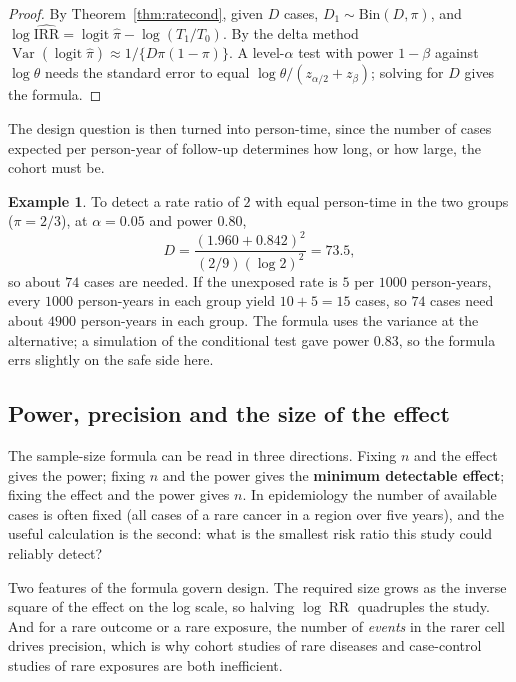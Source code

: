 \documentclass[11pt,a4paper]{article}
\numberwithin{equation}{section}
\DeclareMathOperator{\Var}{Var}
\DeclareMathOperator{\RR}{RR}
\theoremstyle{definition}
\newtheorem{exa}[thm]{Example}
\begin{document}
\begin{proof}
By Theorem~\ref{thm:ratecond}, given $D$ cases, $D_1 \sim \text{Bin}(D, \pi)$, and $\log\widehat{\text{IRR}} = \operatorname{logit}\hat\pi - \log(T_1/T_0)$. By the delta method
$\Var(\operatorname{logit}\hat\pi) \approx 1/\{D\pi(1 - \pi)\}$. A level-$\alpha$ test with power $1 - \beta$ against $\log\theta$ needs the standard error to equal
$\log\theta/(z_{\alpha/2} + z_\beta)$; solving for $D$ gives the formula.
\end{proof}

The design question is then turned into person-time, since the number of cases expected per person-year of follow-up determines how long, or
how large, the cohort must be.

\begin{exa}
To detect a rate ratio of $2$ with equal person-time in the two groups ($\pi = 2/3$), at $\alpha = 0.05$ and power $0.80$,
\[
D = \frac{(1.960 + 0.842)^2}{(2/9)(\log 2)^2} = 73.5 ,
\]
so about $74$ cases are needed. If the unexposed rate is $5$ per $1000$ person-years, every $1000$ person-years in each group yield
$10 + 5 = 15$ cases, so $74$ cases need about $4900$ person-years in each group. The formula uses the variance at
the alternative; a simulation of the conditional test gave power $0.83$, so the formula errs slightly on the safe side here.
\end{exa}

\subsection{Power, precision and the size of the effect}

The sample-size formula can be read in three directions. Fixing $n$ and the effect gives the power; fixing $n$ and the power gives the
\textbf{minimum detectable effect}; fixing the effect and the power gives $n$. In epidemiology the number of available cases is often
fixed (all cases of a rare cancer in a region over five years), and the useful calculation is the second: what is the smallest risk
ratio this study could reliably detect?

Two features of the formula govern design. The required size grows as the inverse square of the effect on the log scale, so halving
$\log\RR$ quadruples the study. And for a rare outcome or a rare exposure, the number of \emph{events} in the rarer cell drives
precision, which is why cohort studies of rare diseases and case-control studies of rare exposures are both inefficient.
\end{document}
